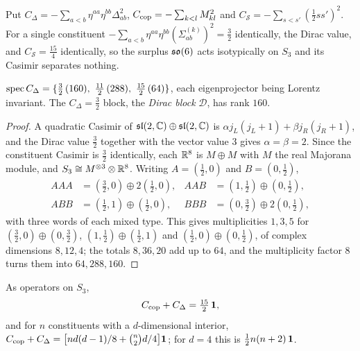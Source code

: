 Put $C_\Delta=-\sum_{a<b}\eta^{aa}\eta^{bb}\Delta_{ab}^2$, $C_{\rm cop}=-\sum_{k<l}M_{kl}^2$ and $C_{\mathcal S}=-\sum_{s<s'}(\tfrac12ss')^2$. For a
single constituent $-\sum_{a<b}\eta^{aa}\eta^{bb}(\Sigma^{(k)}_{ab})^2=\tfrac32$ identically, the Dirac value, and $C_{\mathcal S}=\tfrac{15}4$
identically, so the surplus $\mathfrak{so}(6)$ acts isotypically on $S_3$ and its Casimir separates nothing.

\begin{theorem}
\label{thm:diagCspec}
$\spec C_\Delta=\{\tfrac32\,(160),\ \tfrac{11}2\,(288),\ \tfrac{15}2\,(64)\}$, each eigenprojector being Lorentz invariant. The
$C_\Delta=\tfrac32$ block, the \emph{Dirac block} $\mathcal D$, has rank $160$.
\end{theorem}

\begin{proof}
A quadratic Casimir of $\mathfrak{sl}(2,\mathbb{C})\oplus\mathfrak{sl}(2,\mathbb{C})$ is $\alpha j_L(j_L+1)+\beta j_R(j_R+1)$, and the Dirac value $\tfrac32$ together with the
vector value $3$ gives $\alpha=\beta=2$. Since the constituent Casimir is $\tfrac32$ identically, each $\mathbb{R}^8$ is $M\oplus M$ with $M$ the
real Majorana module, and $S_3\cong M^{\otimes3}\otimes\mathbb{R}^8$. Writing $A=(\tfrac12,0)$ and $B=(0,\tfrac12)$,
\[
\begin{aligned}
AAA&=(\tfrac32,0)\oplus2(\tfrac12,0), & AAB&=(1,\tfrac12)\oplus(0,\tfrac12),\\
ABB&=(\tfrac12,1)\oplus(\tfrac12,0), & BBB&=(0,\tfrac32)\oplus2(0,\tfrac12),
\end{aligned}
\]
with three words of each mixed type. This gives multiplicities $1,3,5$ for $(\tfrac32,0)\oplus(0,\tfrac32)$, $(1,\tfrac12)\oplus(\tfrac12,1)$ and
$(\tfrac12,0)\oplus(0,\tfrac12)$, of complex dimensions $8,12,4$; the totals $8,36,20$ add up to $64$, and the multiplicity factor $8$ turns them
into $64,288,160$.
\end{proof}

\begin{theorem}
\label{thm:casid}
As operators on $S_3$,
\begin{equation}
\label{eq:casid}
C_{\rm cop}+C_\Delta=\tfrac{15}2\,\mathbf 1 ,
\end{equation}
and for $n$ constituents with a $d$-dimensional interior, $C_{\rm cop}+C_\Delta=\bigl[nd(d-1)/8+\binom n2d/4\bigr]\mathbf 1$; for $d=4$ this is
$\tfrac12n(n+2)\,\mathbf 1$.
\end{theorem}

